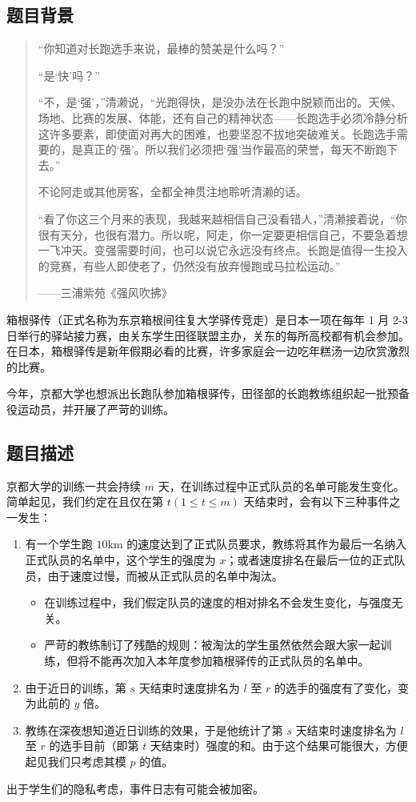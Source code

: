 \subsection*{题目背景}

\begin{quotation}
“你知道对长跑选手来说，最棒的赞美是什么吗？”

“是‘快’吗？”

“不，是‘强’，”清濑说，“光跑得快，是没办法在长跑中脱颖而出的。天候、场地、比赛的发展、体能，还有自己的精神状态——长跑选手必须冷静分析这许多要素，即使面对再大的困难，也要坚忍不拔地突破难关。长跑选手需要的，是真正的‘强’。所以我们必须把‘强’当作最高的荣誉，每天不断跑下去。”

不论阿走或其他房客，全都全神贯注地聆听清濑的话。

“看了你这三个月来的表现，我越来越相信自己没看错人，”清濑接着说，“你很有天分，也很有潜力。所以呢，阿走，你一定要更相信自己，不要急着想一飞冲天。变强需要时间，也可以说它永远没有终点。长跑是值得一生投入的竞赛，有些人即使老了，仍然没有放弃慢跑或马拉松运动。”

——三浦紫苑《强风吹拂》

\end{quotation}

箱根驿传（正式名称为东京箱根间往复大学驿传竞走）是日本一项在每年 1 月 2-3 日举行的驿站接力赛，由关东学生田径联盟主办，关东的每所高校都有机会参加。
在日本，箱根驿传是新年假期必看的比赛，许多家庭会一边吃年糕汤一边欣赏激烈的比赛。

今年，京都大学也想派出长跑队参加箱根驿传，田径部的长跑教练组织起一批预备役运动员，并开展了严苛的训练。

\subsection*{题目描述}

京都大学的训练一共会持续 $m$ 天，在训练过程中正式队员的名单可能发生变化。
简单起见，我们约定在且仅在第 $t (1 \le t \le m)$ 天结束时，会有以下三种事件之一发生：

\begin{enumerate}
    \item 有一个学生跑 $10\mathrm{km}$ 的速度达到了正式队员要求，教练将其作为最后一名纳入正式队员的名单中，这个学生的强度为 $x$；或者速度排名在最后一位的正式队员，由于速度过慢，而被从正式队员的名单中淘汰。
    \begin{itemize}
        \item 在训练过程中，我们假定队员的速度的相对排名不会发生变化，与强度无关。
        \item 严苛的教练制订了残酷的规则：被淘汰的学生虽然依然会跟大家一起训练，但将不能再次加入本年度参加箱根驿传的正式队员的名单中。
    \end{itemize}
    \item 由于近日的训练，第 $s$ 天结束时速度排名为 $l$ 至 $r$ 的选手的强度有了变化，变为此前的 $y$ 倍。
    \item 教练在深夜想知道近日训练的效果，于是他统计了第 $s$ 天结束时速度排名为 $l$ 至 $r$ 的选手目前（即第 $t$ 天结束时）强度的和。由于这个结果可能很大，方便起见我们只考虑其模 $p$ 的值。
\end{enumerate}
出于学生们的隐私考虑，事件日志有可能会被加密。

